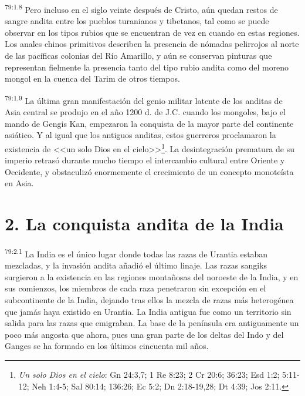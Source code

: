 \par
\textsuperscript{79:1.8} Pero incluso en el siglo veinte después de Cristo, aún quedan restos de sangre andita entre los pueblos turanianos y tibetanos, tal como se puede observar en los tipos rubios que se encuentran de vez en cuando en estas regiones. Los anales chinos primitivos describen la presencia de nómadas pelirrojos al norte de las pacíficas colonias del Río Amarillo, y aún se conservan pinturas que representan fielmente la presencia tanto del tipo rubio andita como del moreno mongol en la cuenca del Tarim de otros tiempos.

\par
\textsuperscript{79:1.9} La última gran manifestación del genio militar latente de los anditas de Asia central se produjo en el año 1200 d. de J.C. cuando los mongoles, bajo el mando de Gengis Kan, empezaron la conquista de la mayor parte del continente asiático. Y al igual que los antiguos anditas, estos guerreros proclamaron la existencia de <<un solo Dios en el cielo>>\footnote{\textit{Un solo Dios en el cielo}: Gn 24:3,7; 1 Re 8:23; 2 Cr 20:6; 36:23; Esd 1:2; 5:11-12; Neh 1:4-5; Sal 80:14; 136:26; Ec 5:2; Dn 2:18-19,28; Dt 4:39; Jos 2:11.}. La desintegración prematura de su imperio retrasó durante mucho tiempo el intercambio cultural entre Oriente y Occidente, y obstaculizó enormemente el crecimiento de un concepto monoteísta en Asia.

\section*{2. La conquista andita de la India}
\par
\textsuperscript{79:2.1} La India es el único lugar donde todas las razas de Urantia estaban mezcladas, y la invasión andita añadió el último linaje. Las razas sangiks surgieron a la existencia en las regiones montañosas del noroeste de la India, y en sus comienzos, los miembros de cada raza penetraron sin excepción en el subcontinente de la India, dejando tras ellos la mezcla de razas más heterogénea que jamás haya existido en Urantia. La India antigua fue como un territorio sin salida para las razas que emigraban. La base de la península era antiguamente un poco más angosta que ahora, pues una gran parte de los deltas del Indo y del Ganges se ha formado en los últimos cincuenta mil años.


